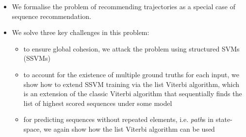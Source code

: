 \begin{itemize}[noitemsep,leftmargin=12pt]%
    \item We formalise the problem of recommending trajectories as a special case of sequence recommendation.          



	\item We solve three key challenges in this problem:
	\begin{itemize}
		\item to ensure global cohesion, we attack the problem using structured SVMs (SSVMs)
		\item to account for the existence of multiple ground truths for each input, we show how
		to extend SSVM training via the list Viterbi algorithm, 
        which is an extension of the classic Viterbi algorithm that sequentially finds the list of highest scored sequences under some model
		\item for predicting sequences without repeated elements, i.e. {\em path}s in state-space, we again show how the list Viterbi algorithm can be used
	\end{itemize}


\end{itemize}

